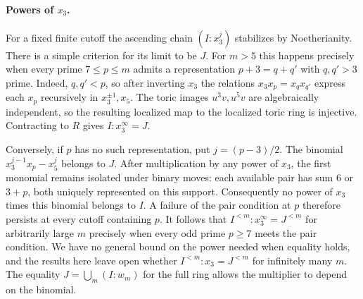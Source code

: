 \paragraph{Powers of \texorpdfstring{$x_3$}{x3}.}
For a fixed finite cutoff the ascending chain $(I:x_3^j)$ stabilizes
by Noetherianity. There is a simple criterion for its limit to be $J$.
For $m>5$ this happens precisely when every prime $7\le p\le m$ admits
a representation $p+3=q+q'$ with $q,q'>3$ prime. Indeed, $q,q'<p$,
so after inverting $x_3$ the relations $x_3x_p=x_qx_{q'}$ express
each $x_p$ recursively in $x_3^{\pm1},x_5$. The toric images
$u^3v,u^5v$ are algebraically independent, so the resulting localized
map to the localized toric ring is injective. Contracting to $R$ gives
$I:x_3^\infty=J$.

Conversely, if $p$ has no such representation, put $j=(p-3)/2$.
The binomial $x_3^{j-1}x_p-x_5^j$ belongs to $J$. After multiplication
by any power of $x_3$, the first monomial remains isolated under binary
moves: each available pair has sum $6$ or $3+p$, both uniquely represented
on this support. Consequently no power of $x_3$ times this binomial belongs to $I$.
A failure of the pair condition at $p$ therefore persists at every
cutoff containing $p$. It follows that $I^{<m}:x_3^\infty=J^{<m}$ for
arbitrarily large $m$ precisely when every odd prime $p\ge7$ meets the
pair condition. We have no general bound on the power needed when
equality holds, and the results here leave open whether
$I^{<m}:x_3=J^{<m}$ for infinitely many $m$. The equality
$J=\bigcup_m(I:w_m)$ for the full ring allows the multiplier to
depend on the binomial.

